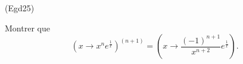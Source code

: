 \begin{tiny}(Egd25)\end{tiny} Montrer que 
\[
 \left( x\rightarrow x^n e^{\frac{1}{x}}\right)^{(n+1)}
 =
 \left( x\rightarrow \frac{(-1)^{n+1}}{x^{n+2}}e^{\frac{1}{x}} \right) .
\]

 